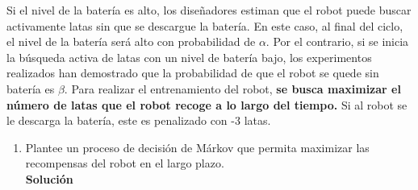 \noindent Si el nivel de la batería es alto, los diseñadores estiman que el robot puede buscar activamente latas sin que se descargue la batería. En este caso, al final del ciclo, el nivel de la batería será alto con probabilidad de $\alpha$. Por el contrario, si se inicia la búsqueda activa de latas con un nivel de batería bajo, los experimentos realizados han demostrado que la probabilidad de que el robot se quede sin batería es $\beta$. Para realizar el entrenamiento del robot, \textbf{se busca maximizar el número de latas que el robot recoge a lo largo del tiempo.} Si al robot se le descarga la batería, este es penalizado con -3 latas. 
    \begin{enumerate}[label=\alph*.] 
        \item Plantee un proceso de decisión de Márkov que permita maximizar las recompensas del robot en el largo plazo. \\
        \noindent \textbf{Solución} \\


\end{enumerate}
